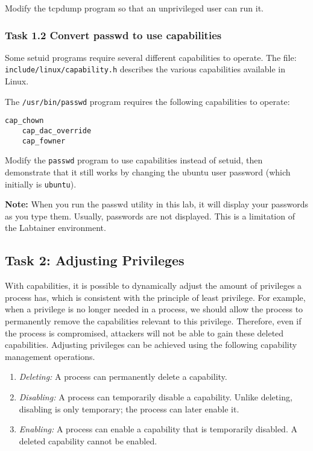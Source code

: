 Modify the tcpdump program so that an unprivileged user can run it.

\subsubsection{Task 1.2 Convert passwd to use capabilities}
Some setuid programs require several different capabilities
to operate.  The file: {\tt include/linux/capability.h}
describes the various capabilities available in Linux.

The \texttt{/usr/bin/passwd} program requires the following
capabilities to operate:

\begin{Verbatim}[frame=single] 
    cap_chown
    cap_dac_override
    cap_fowner
\end{Verbatim}

Modify the \texttt{passwd} program to use capabilities instead of setuid,
then demonstrate that it still works by changing the ubuntu user password
(which initially is \texttt{ubuntu}).

\textbf{Note:} When you run the passwd utility in this lab, it will display
your passwords as you type them.  Usually, passwords are not displayed.  This
is a limitation of the Labtainer environment.


\subsection{Task 2: Adjusting Privileges}

With capabilities, it is possible to dynamically adjust the amount of privileges  
a process has, which is consistent with the principle of least privilege.
For example, when a privilege is no longer needed in a process,
we should allow the process to permanently remove the capabilities
relevant to this privilege. Therefore,
even if the process is compromised, attackers will not be able to
gain these deleted capabilities.
Adjusting privileges can be achieved using the following
capability management operations.
\begin{enumerate}
  \item {\em Deleting:}  A process can permanently delete a capability.
  \item {\em Disabling:} A process can temporarily disable a capability.
        Unlike deleting, disabling is only temporary; the process
        can later enable it.
  \item {\em Enabling:} A process can enable a capability that is temporarily disabled.
        A deleted capability cannot be enabled.
\end{enumerate}

